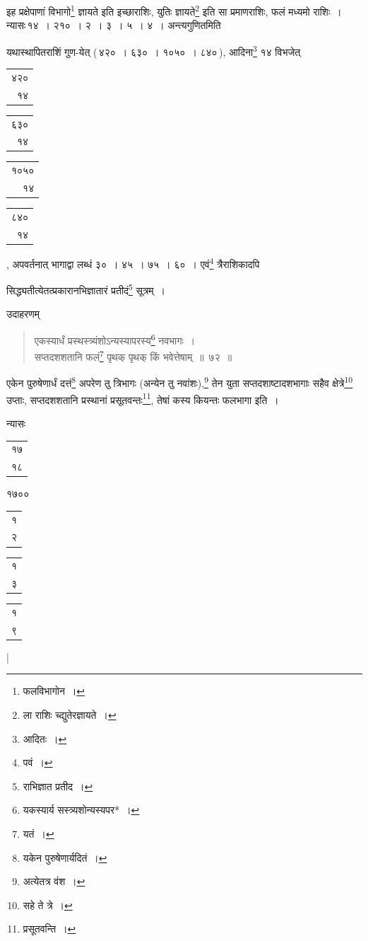 \documentclass[10pt, openany]{book}
\begin{document}
{{{इह प्रक्षेपाणां विभागो\renewcommand{\thefootnote}{\s ३}\footnote{\s फलविभागोन~।} ज्ञायते इति इच्छाराशिः, युतिः ज्ञायते\renewcommand{\thefootnote}{\s ४}\footnote{\s ला राशिः
च्द्युतेरज्ञायते~।}
इति सा प्रमाणराशिः,}
{फलं मध्यमो राशिः~। न्यासः\textendash \,१४~। २१०~। २~। ३~। ५~। ४~।
अन्त्यगुणितमिति}
{यथास्थापितराशिं गुण-येत् (\,४२०~। ६३०~। १०५०~। ८४०\,), आदिना\renewcommand{\thefootnote}{\s ५}\footnote{\s आदितः~।} १४
विभजेत्\begin{tabular}{r|}४२०\\ १४\end{tabular}}{\begin{tabular}{r|}६३०\\ १४\end{tabular}\begin{tabular}{r|}१०५०\\ १४\end{tabular}\begin{tabular}{r} ८४० \\ १४\end{tabular}, अपवर्तनात् भागाद्वा लब्धं ३०~। ४५~। ७५~। ६०~। एवं\renewcommand{\thefootnote}{\s ६}\footnote{\s पवं~।}
त्रैराशिकादपि}
{सिद्ध्यतीत्येतत्प्रकारानभिज्ञातारं प्रतीदं\renewcommand{\thefootnote}{\s ७}\footnote{\s *राभिज्ञात प्रतीद~।} सूत्रम्~।}

\vspace{3mm}
{उदाहरणम्\textemdash}

\begin{quote}
    
{\eg एकस्यार्धं प्रस्थस्त्र्यंशोऽन्यस्यापरस्य\renewcommand{\thefootnote}{\s ८}\footnote{\s यकस्यार्य सस्त्र्यशोन्यस्यपर*~।} नवभागः~। \\
 सप्तदशशतानि फलं\renewcommand{\thefootnote}{\s ९}\footnote{\s यतं~।} पृथक् पृथक् किं भवेत्तेषाम्~॥~७२~॥}\end{quote}

{एकेन पुरुषेणार्धं दत्तं\renewcommand{\thefootnote}{\s १०}\footnote{\s यकेन पुरुषेणार्यदितं~।} अपरेण तु त्रिभागः (अन्येन तु
नवांशः),\renewcommand{\thefootnote}{\s ११}\footnote{\s अत्येतत्र वंश~।} तेन युता सप्तदशाष्टादशभागाः सहैव क्षेत्रे\renewcommand{\thefootnote}{\s १२}\footnote{\s सहे ते त्रे~।} उप्ताः, सप्तदशशतानि प्रस्थानां
प्रसूतवन्तः\renewcommand{\thefootnote}{\s १३}\footnote{\s प्रसूतवन्ति~।}, तेषां कस्य कियन्तः फलभागा इति~।}
\vspace{3mm}

{न्यासः\textendash \,\begin{tabular}{r|}१७\\१८\end{tabular} १७००
\begin{tabular}{|r} १\\ २\end{tabular}\begin{tabular}{|r|} १ \\  ३\end{tabular}\begin{tabular}{r} १\\ ९\end{tabular}}|
\vspace{3mm}

}}
\end{document}
